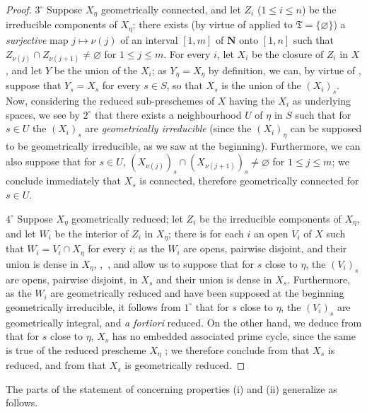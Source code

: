 \begin{proof}
$3^\circ$ Suppose $X_\eta$ geometrically connected, and let $Z_i$ ($1\leqslant i\leqslant n$) be the irreducible components of $X_\eta$; there exists (by virtue of  applied to $\mathfrak{T}=\{\varnothing\}$) a \emph{surjective} map $j\mapsto\nu(j)$ of an interval $[1,m]$ of $\mathbf{N}$ onto $[1,n]$ such that $Z_{\nu(j)}\cap Z_{\nu(j+1)}\neq\varnothing$ for $1\leqslant j\leqslant m$.
For every $i$, let $X_i$ be the closure of $Z_i$ in $X$, and let $Y$ be the union of the $X_i$; as $Y_\eta=X_\eta$ by definition, we can, by virtue of , suppose that $Y_s=X_s$ for every $s\in S$, so that $X_s$ is the union of the $(X_i)_s$.
Now, considering the reduced sub-preschemes of $X$ having the $X_i$ as underlying spaces, we see by $2^\circ$ that there exists a neighbourhood $U$ of $\eta$ in $S$ such that for $s\in U$ the $(X_i)_s$ are \emph{geometrically irreducible} (since the $(X_i)_\eta$ can be supposed to be geometrically irreducible, as we saw at the beginning).
Furthermore, we can also suppose that for $s\in U$, $(X_{\nu(j)})_s\cap(X_{\nu(j+1)})_s\neq\varnothing$  for $1\leqslant j\leqslant m$; we conclude immediately that $X_s$ is connected, therefore  geometrically connected for $s\in U$.

$4^\circ$ Suppose $X_\eta$ geometrically reduced; let $Z_i$ be the irreducible components of $X_\eta$, and let $W_i$ be the interior of $Z_i$ in $X_\eta$; there is for each $i$ an open $V_i$ of $X$ such that $W_i=V_i\cap X_\eta$ for every $i$; as the $W_i$ are opens, pairwise disjoint, and their union is dense in $X_\eta$, ,~, and  allow us to suppose that for $s$ close to $\eta$, the $(V_i)_s$ are opens, pairwise disjoint, in $X_s$ and their union is dense in $X_s$.
Furthermore, as the $W_i$ are geometrically reduced and have been supposed at the beginning geometrically irreducible, it follows from $1^\circ$ that for $s$ close to $\eta$, the $(V_i)_s$ are geometrically integral, and \emph{a fortiori} reduced.
On the other hand, we deduce from  that for $s$ close to $\eta$, $X_s$ has no embedded associated prime cycle, since the same is true of the reduced prescheme $X_\eta$ ; we therefore conclude from  that $X_s$ is reduced, and from  that $X_s$ is geometrically reduced.
\end{proof}


The parts of the statement of  concerning properties (i) and (ii) generalize as follows.

